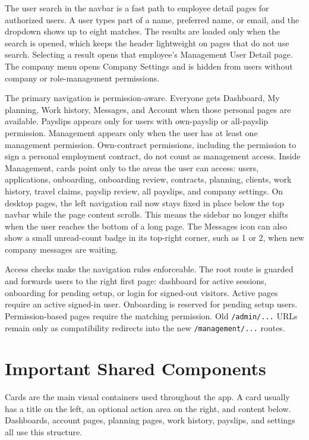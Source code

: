 \documentclass[11pt]{article}
\newcommand{\code}[1]{\nolinkurl{#1}}
\begin{document}
The user search in the navbar is a fast path to employee detail pages for authorized users. A user types part of a name, preferred name, or email, and the dropdown shows up to eight matches. The results are loaded only when the search is opened, which keeps the header lightweight on pages that do not use search. Selecting a result opens that employee's Management User Detail page. The company menu opens Company Settings and is hidden from users without company or role-management permissions.

The primary navigation is permission-aware. Everyone gets Dashboard, My planning, Work history, Messages, and Account when those personal pages are available. Payslips appears only for users with own-payslip or all-payslip permission. Management appears only when the user has at least one management permission. Own-contract permissions, including the permission to sign a personal employment contract, do not count as management access. Inside Management, cards point only to the areas the user can access: users, applications, onboarding, onboarding review, contracts, planning, clients, work history, travel claims, payslip review, all payslips, and company settings. On desktop pages, the left navigation rail now stays fixed in place below the top navbar while the page content scrolls. This means the sidebar no longer shifts when the user reaches the bottom of a long page. The Messages icon can also show a small unread-count badge in its top-right corner, such as 1 or 2, when new company messages are waiting.

Access checks make the navigation rules enforceable. The root route is guarded and forwards users to the right first page: dashboard for active sessions, onboarding for pending setup, or login for signed-out visitors. Active pages require an active signed-in user. Onboarding is reserved for pending setup users. Permission-based pages require the matching permission. Old \code{/admin/...} URLs remain only as compatibility redirects into the new \code{/management/...} routes.
\section{Important Shared Components}

Cards are the main visual containers used throughout the app. A card usually has a title on the left, an optional action area on the right, and content below. Dashboards, account pages, planning pages, work history, payslips, and settings all use this structure.
\end{document}
